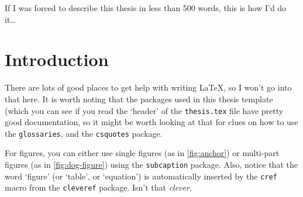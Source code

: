 \documentclass[12pt,xetex]{scrbook}
\begin{document}
\begin{onehalfspace}


If I was forced to describe this thesis in less than 500 words, this
is how I'd do it\ldots


\cleardoublepage
{}
\tableofcontents
\listoffigures
\listoftables


\printglossary[type=\acronymtype,title=Abbreviations]


\mainmatter

\pagestyle{headings}

\chapter{Introduction}
\label{chap:intro}

There are lots of good places to get help with writing LaTeX, so I
won't go into that here.  It is worth noting that the packages used in
this thesis template (which you can see if you read the `header' of
the \texttt{thesis.tex} file have pretty good documentation, so it
might be worth looking at that for clues on how to use the \texttt{glossaries},
and the \texttt{csquotes} package.

For figures, you can either use single figures (as in
\cref{fig:anchor}) or multi-part figures (as in \cref{fig:dog-figure})
using the \texttt{subcaption} package. Also, notice that the word
`figure' (or `table', or `equation') is automatically inserted by the
\texttt{cref} macro from the \texttt{cleveref} package. Isn't that
\emph{clever}.


\end{onehalfspace}
\end{document}
